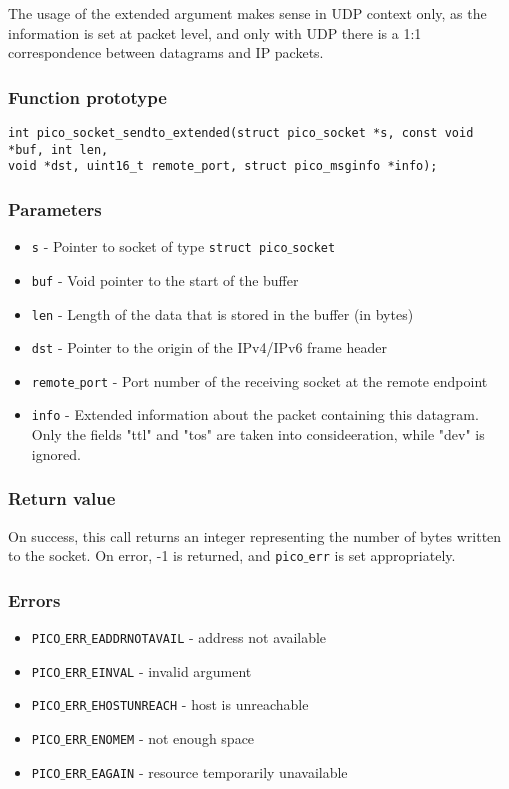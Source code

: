 The usage of the extended argument makes sense in UDP context only, as the information is set at packet level, and only with UDP there is a 1:1 correspondence between datagrams and IP packets.

\subsubsection*{Function prototype}
\begin{verbatim}
int pico_socket_sendto_extended(struct pico_socket *s, const void *buf, int len,
void *dst, uint16_t remote_port, struct pico_msginfo *info);
\end{verbatim}

\subsubsection*{Parameters}
\begin{itemize}[noitemsep]
\item \texttt{s} - Pointer to socket of type \texttt{struct pico$\_$socket}
\item \texttt{buf} - Void pointer to the start of the buffer
\item \texttt{len} - Length of the data that is stored in the buffer (in bytes)
\item \texttt{dst} - Pointer to the origin of the IPv4/IPv6 frame header
\item \texttt{remote$\_$port} - Port number of the receiving socket at the remote endpoint
\item \texttt{info} - Extended information about the packet containing this datagram. Only the fields "ttl" and "tos" are taken into consideeration, while "dev" is ignored.

\end{itemize}

\subsubsection*{Return value}
On success, this call returns an integer representing the number of bytes written to the socket.
On error, -1 is returned, and \texttt{pico$\_$err} is set appropriately.

\subsubsection*{Errors}
\begin{itemize}[noitemsep]
\item \texttt{PICO$\_$ERR$\_$EADDRNOTAVAIL} - address not available
\item \texttt{PICO$\_$ERR$\_$EINVAL} - invalid argument
\item \texttt{PICO$\_$ERR$\_$EHOSTUNREACH} - host is unreachable
\item \texttt{PICO$\_$ERR$\_$ENOMEM} - not enough space
\item \texttt{PICO$\_$ERR$\_$EAGAIN} - resource temporarily unavailable
\end{itemize}

